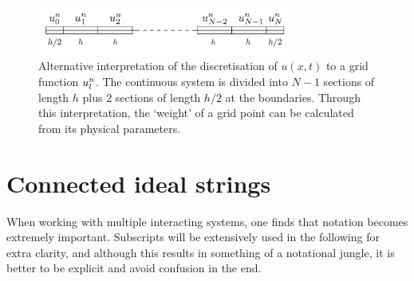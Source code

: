 \begin{figure}[h]
    \centering
    \includegraphics[width=0.75\textwidth]{figures/fdtd/gridFigure2.pdf}
    \caption{Alternative interpretation of the discretisation of $u(x,t)$ to a grid function $u_l^n$. The continuous system is divided into $N-1$ sections of length $h$ plus $2$ sections of length $h/2$ at the boundaries. Through this interpretation, the `weight' of a grid point can be calculated from its physical parameters. \label{fig:gridExp2}}
\end{figure}

\section{Connected ideal strings}\label{sec:connIdealStrings}
When working with multiple interacting systems, one finds that notation becomes extremely important. Subscripts will be extensively used in the following for extra clarity, and although this results in something of a notational jungle, it is better to be explicit and avoid confusion in the end.

